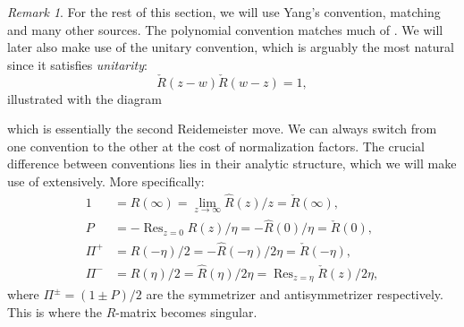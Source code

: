 \documentclass[11pt]{report}
\theoremstyle{definition}
\theoremstyle{remark}
\newtheorem*{remark}{Remark}
\theoremstyle{remark}
\begin{document}
\begin{remark}
For the rest of this section, we will use Yang's convention, matching \cite{book:molev} and many other sources. The polynomial convention matches much of \cite{book:arutyunov:betheAnsatz}. We will later also make use of the unitary convention, which is arguably the most natural since it satisfies \emph{unitarity}:
\begin{equation*}
\check R(z-w) \check{R}(w-z) = 1,
\end{equation*}
illustrated with the diagram
~\\
\begin{center}
\end{center}
which is essentially the second Reidemeister move. We can always switch from one convention to the other at the cost of normalization factors. The crucial difference between conventions lies in their analytic structure, which we will make use of extensively. More specifically:
\begin{align*}
1 &= R(\infty) = \lim_{z \to \infty} \hat{R}(z)/z = \check R(\infty), \\
P &= -\operatorname{Res}_{z=0} R(z)/\eta = -\hat{R}(0)/\eta = \check R(0), \\
\Pi^+ &= R(-\eta)/2 = -\hat{R}(-\eta)/2\eta = \check R(-\eta), \\
\Pi^- &= R(\eta)/2 = \hat{R}(\eta)/2\eta = \operatorname{Res}_{z=\eta} \check R(z)/2\eta,
\end{align*}
where $\Pi^\pm = (1 \pm P)/2$ are the symmetrizer and antisymmetrizer respectively. This is where the $R$-matrix becomes singular.
\end{remark}
\end{document}
